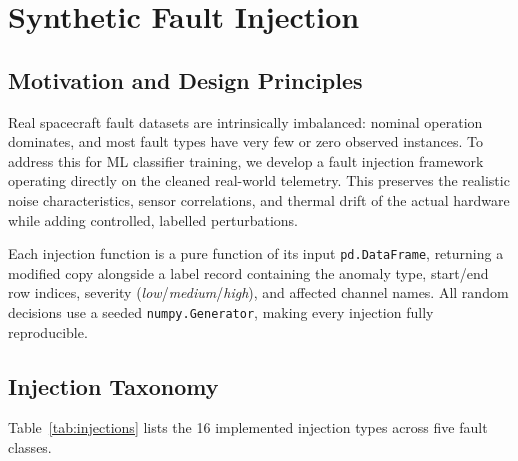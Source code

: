\documentclass[conference]{IEEEtran}
\begin{document}
\section{Synthetic Fault Injection}
\label{sec:injection}

\subsection{Motivation and Design Principles}

Real spacecraft fault datasets are intrinsically imbalanced: nominal
operation dominates, and most fault types have very few or zero
observed instances.  To address this for ML classifier training, we
develop a fault injection framework operating directly on the cleaned
real-world telemetry.  This preserves the realistic noise
characteristics, sensor correlations, and thermal drift of the actual
hardware while adding controlled, labelled perturbations.

Each injection function is a pure function of its input
\texttt{pd.DataFrame}, returning a modified copy alongside a label
record containing the anomaly type, start/end row indices, severity
(\textit{low}/\textit{medium}/\textit{high}), and affected channel
names.  All random decisions use a seeded \texttt{numpy.Generator},
making every injection fully reproducible.

\subsection{Injection Taxonomy}

Table~\ref{tab:injections} lists the 16 implemented injection types
across five fault classes.
\end{document}
